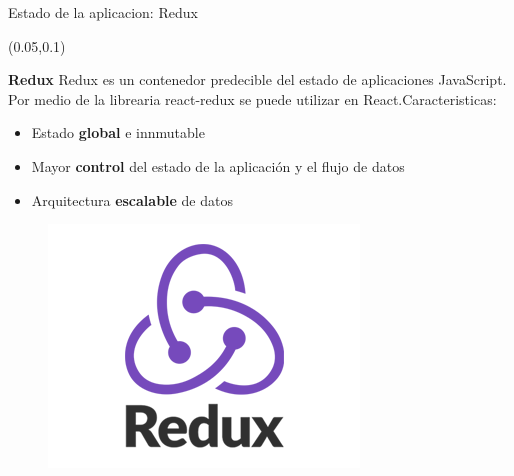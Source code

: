 \documentclass[xcolor=pdftex,dvipsnames,table]{beamer}
\begin{document}
\begin{frame}{Estado de la aplicacion: Redux}
\small{
        \begin{textblock*}{0.45\textwidth}(0.05\textwidth,0.1\textwidth)
            \begin{block}{\textbf{Redux}} 
                   Redux es un contenedor predecible del estado de aplicaciones JavaScript. Por medio de la librearia react-redux se puede utilizar en React.Caracteristicas:
                    \begin{itemize}
                        \item {Estado \textbf{global} e innmutable}
                        \item {Mayor \textbf{control} del estado de la aplicación y el flujo de datos}
                        \item {Arquitectura \textbf{escalable} de datos }
                    \end{itemize}
            \end{block}
            \vspace{-0.3cm}
            \begin{figure}
                \centering
                \includegraphics[width=0.7\linewidth]{front/Redux.png}
            \end{figure}
    \end{textblock*}
    
}
\end{frame}
\end{document}
